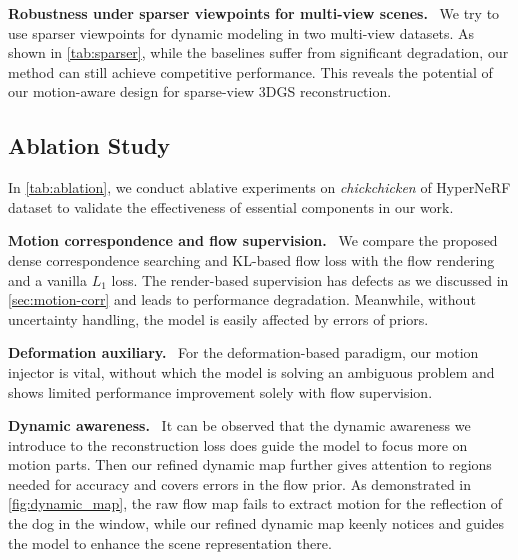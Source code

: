 \documentclass[runningheads]{llncs}
\newcommand{\parsection}[1]{\noindent\textbf{#1.}~}
\begin{document}
\parsection{Robustness under sparser viewpoints for multi-view scenes}
%
We try to use sparser viewpoints for dynamic modeling in two multi-view datasets.
As shown in \cref{tab:sparser}, while the baselines suffer from significant degradation, our method can still achieve competitive performance. This reveals the potential of our motion-aware design for sparse-view 3DGS reconstruction.

\subsection{Ablation Study}

In \cref{tab:ablation}, we conduct ablative experiments on \textit{chickchicken} of HyperNeRF dataset to validate the effectiveness of essential components in our work.

\parsection{Motion correspondence and flow supervision}
%
We compare the proposed dense correspondence searching and KL-based flow loss with the flow rendering and a vanilla $L_1$ loss. The render-based supervision has defects as we discussed in \cref{sec:motion-corr} and leads to performance degradation. Meanwhile, without uncertainty handling, the model is easily affected by errors of priors.

\parsection{Deformation auxiliary}
%
For the deformation-based paradigm, our motion injector is vital, without which the model is solving an ambiguous problem and shows limited performance improvement solely with flow supervision.

\parsection{Dynamic awareness}
%
It can be observed that the dynamic awareness we introduce to the reconstruction loss does guide the model to focus more on motion parts.
Then our refined dynamic map further gives attention to regions needed for accuracy and covers errors in the flow prior. As demonstrated in \cref{fig:dynamic_map}, the raw flow map fails to extract motion for the reflection of the dog in the window, while our refined dynamic map keenly notices and guides the model to enhance the scene representation there.
\end{document}
